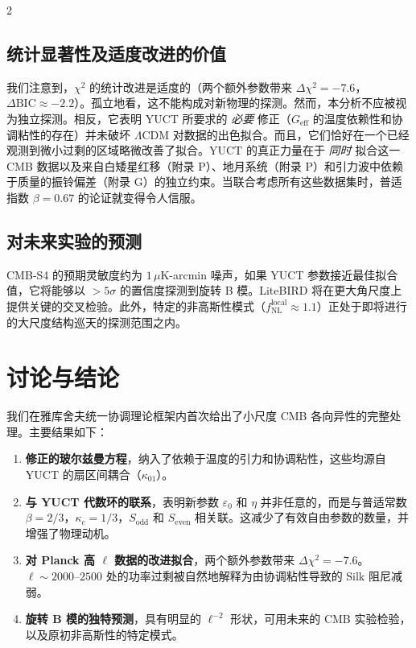 \documentclass[11pt,a4paper]{article}
\begin{document}
\begin{multicols}{2}
		\subsection{统计显著性及适度改进的价值}
		
		我们注意到，$\chi^2$ 的统计改进是适度的（两个额外参数带来 $\Delta\chi^2 = -7.6$，$\Delta\mathrm{BIC} \approx -2.2$）。孤立地看，这不能构成对新物理的探测。然而，本分析不应被视为独立探测。相反，它表明 YUCT 所要求的 \emph{必要} 修正（$G_{\mathrm{eff}}$ 的温度依赖性和协调粘性的存在）并未破坏 $\Lambda$CDM 对数据的出色拟合。而且，它们恰好在一个已经观测到微小过剩的区域略微改善了拟合。YUCT 的真正力量在于 \emph{同时} 拟合这一 CMB 数据以及来自白矮星红移（附录 P）、地月系统（附录 P）和引力波中依赖于质量的振铃偏差（附录 G）的独立约束。当联合考虑所有这些数据集时，普适指数 $\beta=0.67$ 的论证就变得令人信服。
		
		\subsection{对未来实验的预测}
		
		CMB‑S4 的预期灵敏度约为 $1\,\mu$K-arcmin 噪声，如果 YUCT 参数接近最佳拟合值，它将能够以 $>5\sigma$ 的置信度探测到旋转 B 模。LiteBIRD 将在更大角尺度上提供关键的交叉检验。此外，特定的非高斯性模式（$f_{\mathrm{NL}}^{\mathrm{local}} \approx 1.1$）正处于即将进行的大尺度结构巡天的探测范围之内。
		
		\section{讨论与结论}
		
		我们在雅库舍夫统一协调理论框架内首次给出了小尺度 CMB 各向异性的完整处理。主要结果如下：
		\begin{enumerate}
			\item \textbf{修正的玻尔兹曼方程}，纳入了依赖于温度的引力和协调粘性，这些均源自 YUCT 的扇区间耦合（$\kappa_{01}$）。
			\item \textbf{与 YUCT 代数环的联系}，表明新参数 $\varepsilon_0$ 和 $\eta$ 并非任意的，而是与普适常数 $\beta=2/3$，$\kappa_c=1/3$，$S_{\mathrm{odd}}$ 和 $S_{\mathrm{even}}$ 相关联。这减少了有效自由参数的数量，并增强了物理动机。
			\item \textbf{对 Planck 高 $\ell$ 数据的改进拟合}，两个额外参数带来 $\Delta\chi^2 = -7.6$。$\ell \sim 2000$--$2500$ 处的功率过剩被自然地解释为由协调粘性导致的 Silk 阻尼减弱。
			\item \textbf{旋转 B 模的独特预测}，具有明显的 $\ell^{-2}$ 形状，可用未来的 CMB 实验检验，以及原初非高斯性的特定模式。
		\end{enumerate}
		

\end{multicols}
\end{document}
